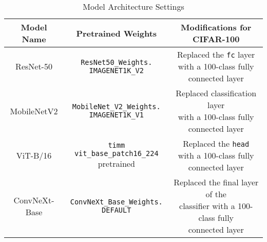 \begin{table}[h]
    \centering
    \caption{Model Architecture Settings}
    \small
    \begin{tabular}{|c|c|c|}
    \hline
    \textbf{Model Name}   & \textbf{Pretrained Weights}            & \textbf{Modifications for CIFAR-100}                     \\ \hline
    ResNet-50 \cite{pytorchresnet}            & \makecell[l]{\texttt{ResNet50\_Weights.} \\ \texttt{IMAGENET1K\_V2}} 
    & \makecell[l]{Replaced the \texttt{fc} layer \\ with a 100-class fully connected layer} \\ \hline
    MobileNetV2  \cite{pytorch_mobilenetv2}         & \makecell[l]{\texttt{MobileNet\_V2\_Weights.} \\ \texttt{IMAGENET1K\_V1}} 
                          & \makecell[l]{Replaced classification layer \\ with a 100-class fully connected layer} \\ \hline
    ViT-B/16 \cite{dosovitskiy2021imageworth16x16words}              & \makecell[l]{\texttt{timm vit\_base\_patch16\_224} \\ pretrained} 
                          & \makecell[l]{Replaced the \texttt{head} \\ with a 100-class fully connected layer} \\ \hline
    ConvNeXt-Base \cite{pytorch-convnext}       & \makecell[l]{\texttt{ConvNeXt\_Base\_Weights.} \\ \texttt{DEFAULT}} 
                          & \makecell[l]{Replaced the final layer of the \\ classifier with a 100-class fully \\ connected layer} \\ \hline
    \end{tabular}
    \label{tab:model_settings}
\end{table}




